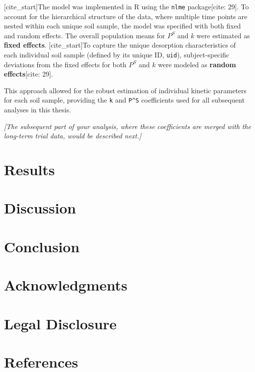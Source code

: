 \documentclass[
  letterpaper,
  DIV=11,
  numbers=noendperiod]{scrartcl}
\begin{document}
{[}cite\_start{]}The model was implemented in R using the \texttt{nlme}
package{[}cite: 29{]}. To account for the hierarchical structure of the
data, where multiple time points are nested within each unique soil
sample, the model was specified with both fixed and random effects. The
overall population means for \(P^S\) and \(k\) were estimated as
\textbf{fixed effects}. {[}cite\_start{]}To capture the unique
desorption characteristics of each individual soil sample (defined by
its unique ID, \texttt{uid}), subject-specific deviations from the fixed
effects for both \(P^S\) and \(k\) were modeled as \textbf{random
effects}{[}cite: 29{]}.

This approach allowed for the robust estimation of individual kinetic
parameters for each soil sample, providing the \texttt{k} and
\texttt{P\^{}S} coefficients used for all subsequent analyses in this
thesis.

\emph{{[}The subsequent part of your analysis, where these coefficients
are merged with the long-term trial data, would be described next.{]}}

\section{Results}\label{results}

\section{Discussion}\label{discussion}

\section{Conclusion}\label{conclusion}

\section{Acknowledgments}\label{acknowledgments}

\section{Legal Disclosure}\label{legal-disclosure}

\section*{References}\label{references}
\end{document}
